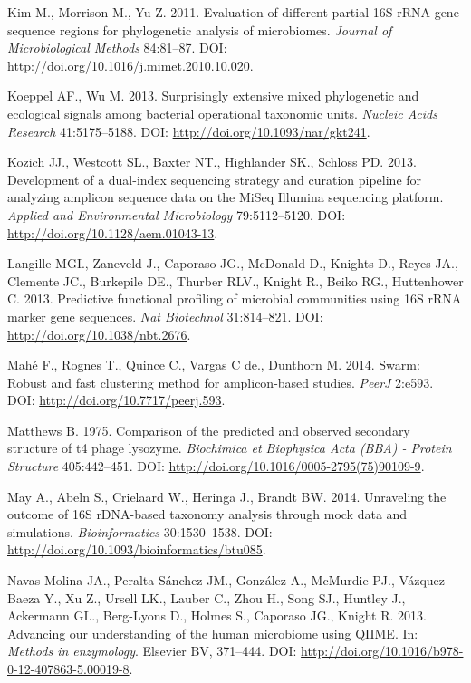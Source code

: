 \documentclass[11pt,]{article}
\begin{document}
Kim M., Morrison M., Yu Z. 2011. Evaluation of different partial 16S
rRNA gene sequence regions for phylogenetic analysis of microbiomes.
\emph{Journal of Microbiological Methods} 84:81--87. DOI:
\url{http://doi.org/10.1016/j.mimet.2010.10.020}.

Koeppel AF., Wu M. 2013. Surprisingly extensive mixed phylogenetic and
ecological signals among bacterial operational taxonomic units.
\emph{Nucleic Acids Research} 41:5175--5188. DOI:
\url{http://doi.org/10.1093/nar/gkt241}.

Kozich JJ., Westcott SL., Baxter NT., Highlander SK., Schloss PD. 2013.
Development of a dual-index sequencing strategy and curation pipeline
for analyzing amplicon sequence data on the MiSeq Illumina sequencing
platform. \emph{Applied and Environmental Microbiology} 79:5112--5120.
DOI: \url{http://doi.org/10.1128/aem.01043-13}.

Langille MGI., Zaneveld J., Caporaso JG., McDonald D., Knights D., Reyes
JA., Clemente JC., Burkepile DE., Thurber RLV., Knight R., Beiko RG.,
Huttenhower C. 2013. Predictive functional profiling of microbial
communities using 16S rRNA marker gene sequences. \emph{Nat Biotechnol}
31:814--821. DOI: \url{http://doi.org/10.1038/nbt.2676}.

Mahé F., Rognes T., Quince C., Vargas C de., Dunthorn M. 2014. Swarm:
Robust and fast clustering method for amplicon-based studies.
\emph{PeerJ} 2:e593. DOI: \url{http://doi.org/10.7717/peerj.593}.

Matthews B. 1975. Comparison of the predicted and observed secondary
structure of t4 phage lysozyme. \emph{Biochimica et Biophysica Acta
(BBA) - Protein Structure} 405:442--451. DOI:
\url{http://doi.org/10.1016/0005-2795(75)90109-9}.

May A., Abeln S., Crielaard W., Heringa J., Brandt BW. 2014. Unraveling
the outcome of 16S rDNA-based taxonomy analysis through mock data and
simulations. \emph{Bioinformatics} 30:1530--1538. DOI:
\url{http://doi.org/10.1093/bioinformatics/btu085}.

Navas-Molina JA., Peralta-Sánchez JM., González A., McMurdie PJ.,
Vázquez-Baeza Y., Xu Z., Ursell LK., Lauber C., Zhou H., Song SJ.,
Huntley J., Ackermann GL., Berg-Lyons D., Holmes S., Caporaso JG.,
Knight R. 2013. Advancing our understanding of the human microbiome
using QIIME. In: \emph{Methods in enzymology}. Elsevier BV, 371--444.
DOI: \url{http://doi.org/10.1016/b978-0-12-407863-5.00019-8}.
\end{document}
